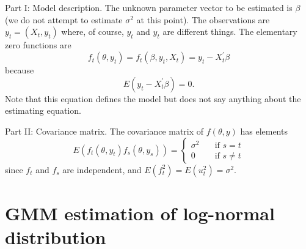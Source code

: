 \documentclass{article}
\begin{document}
Part I: Model description. The unknown parameter vector to be estimated is $%
\beta $ (we do not attempt to estimate $\sigma ^{2}$ at this point). The
observations are $y_{t}=(X_{t},y_{t})$ where, of course, $y_{t}$ and $y_{t}$
are different things. The elementary zero functions are%
\begin{equation*}
f_{t}(\theta ,y_{t})=f_{t}(\beta ,y_{t},X_{t})=y_{t}-X_{t}^{\prime }\beta
\end{equation*}%
because%
\begin{equation*}
E(y_{t}-X_{t}^{\prime }\beta )=0.
\end{equation*}%
Note that this equation defines the model but does not say anything about
the estimating equation.

Part II: Covariance matrix. The covariance matrix of $f\left( \theta
,y\right) $ has elements%
\begin{equation*}
E(f_{t}(\theta ,y_{t})f_{s}(\theta ,y_{s}))=\left\{
\begin{array}{ll}
\sigma ^{2} & \quad \text{if }s=t \\
0 & \quad \text{if }s\neq t%
\end{array}%
\right.
\end{equation*}%
since $f_{t}$ and $f_{s}$ are independent, and $E(f_{t}^{2})=E(u_{t}^{2})=%
\sigma ^{2}$.

\section{GMM estimation of log-normal distribution}
\end{document}
